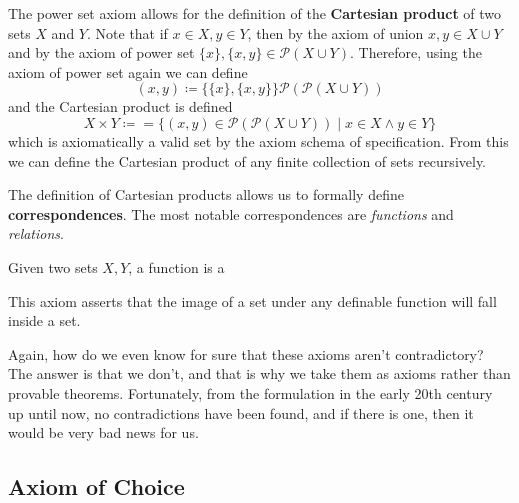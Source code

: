 \documentclass{article}
\begin{document}
    \begin{definition}
      The power set axiom allows for the definition of the \textbf{Cartesian product} of two sets $X$ and $Y$. Note that if $x \in X, y \in Y$, then by the axiom of union $x, y \in X \cup Y$ and by the axiom of power set $\{x\}, \{x, y\} \in \mathcal{P}(X \cup Y)$. Therefore, using the axiom of power set again we can define
      \begin{equation}
        (x, y) \coloneqq \{\{x\}, \{x, y\}\} \mathcal{P}(\mathcal{P}(X \cup Y))
      \end{equation} 
      and the Cartesian product is defined 
      \begin{equation}
        X \times Y \coloneqq = \{ (x, y) \in \mathcal{P}(\mathcal{P}(X \cup Y))  \mid x \in X \land y \in Y \}
      \end{equation}
      which is axiomatically a valid set by the axiom schema of specification. From this we can define the Cartesian product of any finite collection of sets recursively. 
    \end{definition}

    The definition of Cartesian products allows us to formally define \textbf{correspondences}. The most notable correspondences are \textit{functions} and \textit{relations}. 

    \begin{definition}[Function]
      Given two sets $X, Y$, a function is a 
    \end{definition}

    \begin{definition}[Relation]
      
    \end{definition}

    \begin{axiom}
      This axiom asserts that the image of a set under any definable function will fall inside a set. 
    \end{axiom} 

    Again, how do we even know for sure that these axioms aren't contradictory? The answer is that we don't, and that is why we take them as axioms rather than provable theorems. Fortunately, from the formulation in the early 20th century up until now, no contradictions have been found, and if there is one, then it would be very bad news for us.  

  \subsection{Axiom of Choice}
\end{document}
